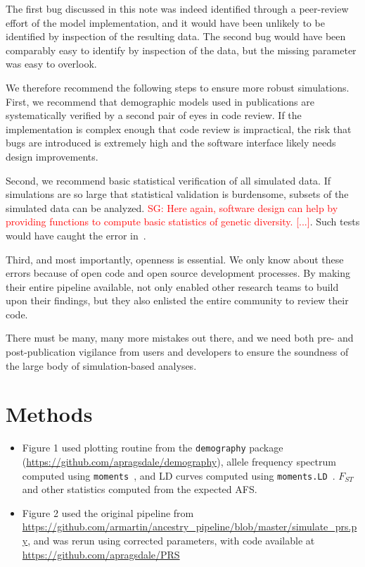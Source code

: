 \documentclass{article}
\newcommand{\sgcomment}[1]{{\textcolor{red}{SG: #1}}}
\begin{document}
The first bug discussed in this note was indeed identified through a peer-review effort of the 
model implementation,  and it would have been unlikely to be identified by inspection of the 
resulting data. The second bug would have been comparably easy to identify by inspection of the data, 
but the missing parameter was easy to overlook. 

We therefore recommend the following steps to ensure more robust simulations.
First, we recommend that demographic models used in publications 
are systematically verified by a second pair of eyes in code review. If the implementation is complex enough
that code review is impractical, the risk that bugs are introduced is extremely high and the software 
interface likely needs design improvements. 

Second, we recommend basic statistical verification of all simulated data. If simulations are so large that
statistical validation is burdensome, subsets of the simulated data can be analyzed. 
\sgcomment{Here again, software design can help by providing functions to compute 
basic statistics of genetic diversity. [...]}. Such tests would have caught the error in~\citet{martin2017human}.


Third, and most importantly, openness is essential. We only know about these errors because of open code and
open source development processes. By making their entire pipeline available, \citet{martin2017human} not only 
enabled other research teams to build upon their findings, but they also enlisted the entire community to review their code. 

There must be many, many more mistakes out there, and we need both pre- and post-publication vigilance from 
users and developers to ensure the soundness of the large body of simulation-based analyses. 


\section{Methods}

\begin{itemize}
\item Figure 1 used plotting routine from the \texttt{demography} package (\url{https://github.com/apragsdale/demography}),
allele frequency spectrum computed using \texttt{moments}~\citep{jouganous2017inferring}, and LD curves
computed using \texttt{moments.LD}~\citep{ragsdale2019models}. $F_{ST}$ and other statistics computed
from the expected AFS.
\item Figure 2 used the original pipeline from \url{https://github.com/armartin/ancestry_pipeline/blob/master/simulate_prs.py},
and was rerun using corrected parameters, with code available at \url{https://github.com/apragsdale/PRS}
\end{itemize}
\end{document}
